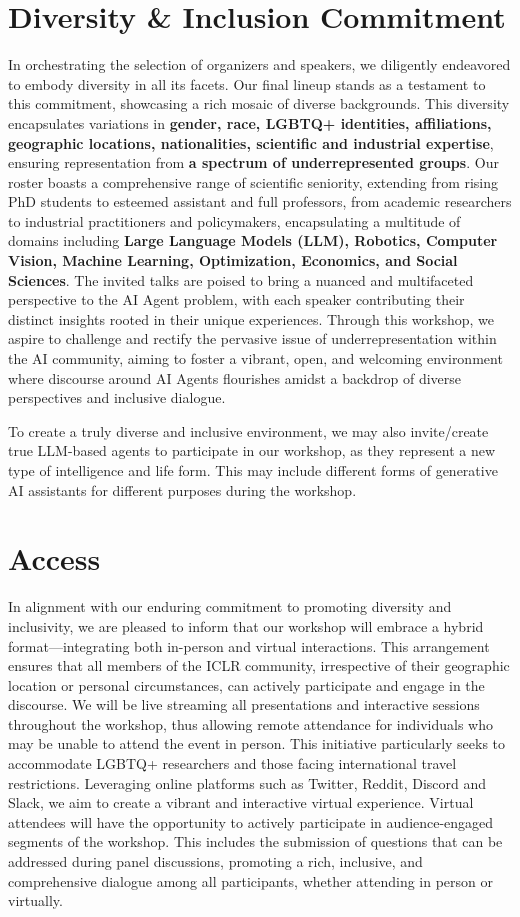 \documentclass[10pt]{article} %
\begin{document}
\section{Diversity \& Inclusion Commitment }

In orchestrating the selection of organizers and speakers, we diligently endeavored to embody diversity in all its facets. Our final lineup stands as a testament to this commitment, showcasing a rich mosaic of diverse backgrounds. This diversity encapsulates variations in \textbf{gender, race, LGBTQ+ identities, affiliations, geographic locations, nationalities, scientific and industrial expertise}, ensuring representation from \textbf{a spectrum of underrepresented groups}. Our roster boasts a comprehensive range of scientific seniority, extending from rising PhD students to esteemed assistant and full professors, from academic researchers to industrial practitioners and policymakers, encapsulating a multitude of domains including \textbf{Large Language Models (LLM), Robotics, Computer Vision, Machine Learning, Optimization, Economics, and Social Sciences}. The invited talks are poised to bring a nuanced and multifaceted perspective to the AI Agent problem, with each speaker contributing their distinct insights rooted in their unique experiences. Through this workshop, we aspire to challenge and rectify the pervasive issue of underrepresentation within the AI community, aiming to foster a vibrant, open, and welcoming environment where discourse around AI Agents flourishes amidst a backdrop of diverse perspectives and inclusive dialogue.


To create a truly diverse and inclusive environment, we may also invite/create true LLM-based agents to participate in our workshop, as they represent a new type of intelligence and life form. This may include different forms of generative AI assistants for different purposes during the workshop.

\section{Access}
In alignment with our enduring commitment to promoting diversity and inclusivity, we are pleased to inform that our workshop will embrace a hybrid format—integrating both in-person and virtual interactions. This arrangement ensures that all members of the ICLR community, irrespective of their geographic location or personal circumstances, can actively participate and engage in the discourse. We will be live streaming all presentations and interactive sessions throughout the workshop, thus allowing remote attendance for individuals who may be unable to attend the event in person. This initiative particularly seeks to accommodate LGBTQ+ researchers and those facing international travel restrictions. Leveraging online platforms such as Twitter, Reddit, Discord and Slack, we aim to create a vibrant and interactive virtual experience. Virtual attendees will have the opportunity to actively participate in audience-engaged segments of the workshop. This includes the submission of questions that can be addressed during panel discussions, promoting a rich, inclusive, and comprehensive dialogue among all participants, whether attending in person or virtually.
\end{document}
